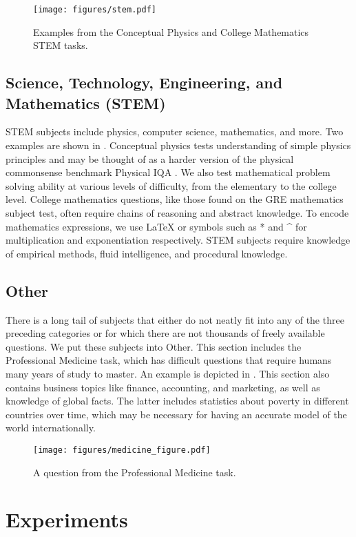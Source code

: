 \begin{figure}[t]
    \centering
    \texttt{[image: figures/stem.pdf]}
    \caption{Examples from the Conceptual Physics and College Mathematics STEM tasks.
    }
    \label{fig:stem}
    \vspace{-10pt}
\end{figure}

\subsection{Science, Technology, Engineering, and Mathematics (STEM)}
STEM subjects include physics, computer science, mathematics, and more. Two examples are shown in . Conceptual physics tests understanding of simple physics principles and may be thought of as a harder version of the physical commonsense benchmark Physical IQA \citep{bisk2019physicaliqa}. We also test mathematical problem solving ability at various levels of difficulty, from the elementary to the college level.
College mathematics questions, like those found on the GRE mathematics subject test, often require chains of reasoning and abstract knowledge. To encode mathematics expressions, we use LaTeX or symbols such as * and \^{} for multiplication and exponentiation respectively. STEM subjects require knowledge of empirical methods, fluid intelligence, and procedural knowledge.

\subsection{Other}
There is a long tail of subjects that either do not neatly fit into any of the three preceding categories or for which there are not thousands of freely available questions. We put these subjects into Other.
This section includes the Professional Medicine task, which has difficult questions that require humans many years of study to master.
An example is depicted in .
This section also contains business topics like finance, accounting, and marketing, as well as knowledge of global facts. The latter includes statistics about poverty in different countries over time, which may be necessary for having an accurate model of the world internationally.

\begin{figure}[t]
    \centering
    \vspace{-15pt}
    \texttt{[image: figures/medicine\_figure.pdf]}
    \caption{A question from the Professional Medicine task.%
    }
    \label{fig:other}
    \vspace{-15pt}
\end{figure}\section{Experiments}

